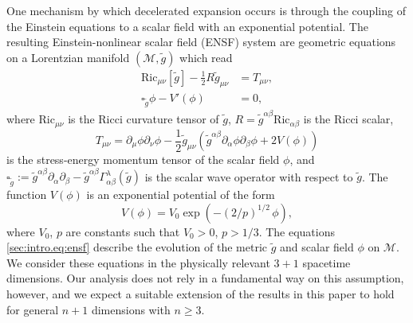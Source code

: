\documentclass{article}
\newcommand{\Ric}{\mathrm{Ric}}
\newcommand{\mc}{\mathcal}
\newcommand{\wt}{\widetilde}
\newcommand{\pa}{\partial}
\begin{document}
One mechanism by which decelerated expansion occurs is through the coupling of the Einstein equations to a scalar field with an exponential potential. The resulting Einstein-nonlinear scalar field (ENSF) system are geometric equations on a Lorentzian manifold $(\mc{M},\wt{g})$ which read
\begin{subequations}\label{sec:intro.eq:ensf}
    \begin{align}
        \Ric_{\mu\nu}[\wt{g}] - \frac{1}{2}R{}{\wt{g}}_{\mu\nu} &= T_{\mu\nu},\label{sec:intro.eq:einstein}\\
        \square_{\wt{g}}\phi - V'(\phi) &= 0\label{sec:intro.eq:scalarfield},
    \end{align}
\end{subequations}
where $\Ric_{\mu\nu}$ is the Ricci curvature tensor of $\wt{g}$, $R = \wt{g}^{\alpha\beta}\Ric_{\alpha\beta}$ is the Ricci scalar, 
\begin{equation}
    T_{\mu\nu} = \pa_\mu \phi \pa_\nu \phi - \frac{1}{2}\wt{g}_{\mu\nu}(\wt{g}^{\alpha\beta}\pa_\alpha \phi \pa_\beta \phi + 2V(\phi))
\end{equation}
is the stress-energy momentum tensor of the scalar field $\phi$, and $\square_{\wt{g}} := \wt{g}^{\alpha\beta}\pa_\alpha\pa_\beta - \wt{g}^{\alpha\beta}\Gamma_{\alpha\beta}^\lambda(\wt{g})$ is the scalar wave operator with respect to $\wt{g}$. The function $V(\phi)$ is an exponential potential of the form
\begin{equation}\label{sec:intro.eq:potential}
    V(\phi) = V_0 \exp(-(2/p)^{1/2}\,\phi),
\end{equation}
where $V_0$, $p$ are constants such that $V_0 > 0$, $p > 1/3$.
The equations \eqref{sec:intro.eq:ensf} describe the evolution of the metric $\wt{g}$ and scalar field $\phi$ on $\mc{M}$. We consider these equations in the physically relevant $3+1$ spacetime dimensions. Our analysis does not rely in a fundamental way on this assumption, however, and we expect a suitable extension of the results in this paper to hold for general $n+1$ dimensions with $n \geq 3$.
\end{document}
